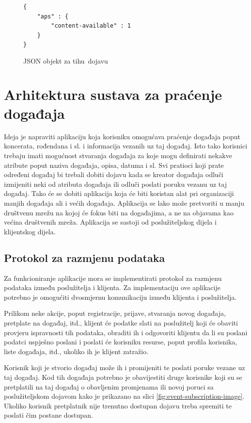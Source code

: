 \documentclass[times, utf8, zavrsni]{fer}
\begin{document}
{\begin{figure}[t!]
\begin{lstlisting}
{
    "aps" : {
        "content-available" : 1
    }
}
\end{lstlisting}
\caption{JSON objekt za \glqq tihu\grqq\  dojavu}
\label{lst:tiha-dojava}
\end{figure}

\chapter{Arhitektura sustava za praćenje događaja}
\label{chp:architecture}

Ideja je napraviti aplikaciju koja korisniku omogućava praćenje događaja poput koncerata, rođendana i sl. i informacija vezanih uz taj događaj. Isto tako korisnici trebaju imati mogućnost stvaranja događaja za koje mogu definirati nekakve atribute poput naziva događaja, opisa, datuma i sl. Svi pratioci koji prate određeni događaj bi trebali dobiti dojavu kada se kreator događaja odluči izmijeniti neki od atributa događaja ili odluči poslati poruku vezanu uz taj događaj. Tako će se dobiti aplikacija koja će biti koristan alat pri organizaciji manjih događaja ali i većih događaja. Aplikacija se lako može pretvoriti u manju društvenu mrežu na kojoj će fokus biti na događajima, a ne na objavama kao većina društvenih mreža. Aplikacija se sastoji od poslužiteljskog dijela i klijentskog dijela.

\section{Protokol za razmjenu podataka}
Za funkcioniranje aplikacije mora se implementirati protokol za razmjenu podataka između poslužitelja i klijenta. Za implementaciju ove aplikacije potrebno je omogućiti dvosmjernu komunikaciju između klijenta i poslužitelja.

Prilikom neke akcije, poput registracije, prijave, stvaranja novog događaja, pretplate na događaj, itd., klijent će podatke slati na poslužitelj koji će obaviti provjeru ispravnosti tih podataka, obraditi ih i odgovoriti klijentu da li su poslani podatci uspješno poslani i poslati će korisniku resurse, poput profila korisnika, liste događaja, itd., ukoliko ih je klijent zatražio.

Korisnik koji je stvorio događaj može ih i promijeniti te poslati poruke vezane uz taj događaj. Kod tih događaja potrebno je obavijestiti druge korisnike koji su se pretplatili na taj događaj o obavljenim promjenama ili novoj poruci sa poslužiteljskom dojavom kako je prikazano na slici \ref{fig:event-subscription-image}. Ukoliko korisnik pretplatnik nije trenutno dostupan dojavu treba spremiti te poslati čim postane dostupan.

}
\end{document}
